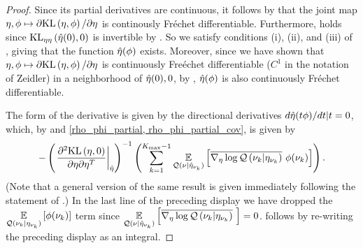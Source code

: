 \begin{proof}
Since its partial derivatives are continuous, it follows by \citet[Proposition
4.14(c)]{zeidler:2013:functional} that the joint map $\eta, \phi \mapsto
\partial \mathrm{KL}\left(\eta, \phi\right) / \partial \eta$ is continously Fr{\'e}chet
differentiable.  Furthermore, \citet[Chapter 4 Condition
21b]{zeidler:2013:functional} holds since $\mathrm{KL}_{\eta\eta}\left(\hat\eta(0), 0\right)$ is
invertible by .   So we satisfy conditions (i),
(ii), and (iii) of \citet[Theorem 4.B(c)]{zeidler:2013:functional}, giving that
the function $\hat\eta(\phi)$ exists.  Moreover, since we have shown that $\eta,
\phi \mapsto \partial \mathrm{KL}\left(\eta, \phi\right) / \partial \eta$ is continuously
Fre{\'e}chet differentiable ($C^1$ in the notation of Zeidler) in a neighborhood
of $\hat\eta(0), 0$, by \citet[Theorem 4.B(d)]{zeidler:2013:functional},
$\hat\eta(\phi)$ is also continuously Fr{\'e}chet differentiable.

The form of the derivative is given by the directional derivatives $d \hat\eta(t
\phi) / dt | t = 0$, which, by  and \eqref{rho_phi_partial,
rho_phi_partial_cov}, is given by
%
\begin{align*}
%
-\left(\fracat{\partial^2 \KL{\eta, \phiz}}
                {\partial \eta \partial \eta^T}
                {\etaopt}\right)^{-1}
\left(
    \sumkm \expect{\q(\nu \vert \etaoptnuk)}
                  {\lqgradbar{\nuk \vert \etanuk}
                   \phi(\nuk) }
\right).
%
\end{align*}
%
(Note that a general version of the same result is given immediately following
the statement of \citet[Theorem 4.B(c)]{zeidler:2013:functional}.)  In the last
line of the preceding display we have dropped the $\underset{\mathcal{Q}(\nu_{k} \vert
\eta_{\nu_{k}})}{\mathbb{E}}\left[\phi(\nu_{k})\right]$ term since $\underset{\mathcal{Q}(\nu \vert \hat\eta_{\nu_{k}})}{\mathbb{E}}\left[\overline{{\nabla_\eta \log \mathcal{Q}}\left(\nu_{k} \vert \eta_{\nu_{k}}\right)}\,\,\right] = 0$.   follows by
re-writing the preceding display as an integral.
%
\end{proof}
%
